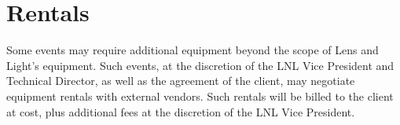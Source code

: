 \section{Rentals}

Some events may require additional equipment beyond the scope of Lens and
Light's equipment. Such events, at the discretion of the LNL Vice President and
Technical Director, as well as the agreement of the client, may negotiate
equipment rentals with external vendors. Such rentals will be billed to the
client at cost, plus additional fees at the discretion of the LNL Vice
President.


